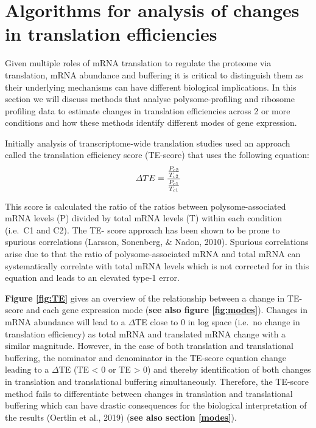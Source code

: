 \documentclass[
  12pt,
  openany]{book}
\begin{document}
\section{Algorithms for analysis of changes in translation efficiencies}\label{algorithm}

Given multiple roles of mRNA translation to regulate the proteome via translation, mRNA abundance and buffering it is critical to distinguish them as their underlying mechanisms can have different biological implications. In this section we will discuss methods that analyse polysome-profiling and ribosome profiling data to estimate changes in translation efficiencies across 2 or more conditions and how these methods identify different modes of gene expression.

Initially analysis of transcriptome-wide translation studies used an approach called the translation efficiency score (TE-score) that uses the following equation:
\[\varDelta TE = \frac{\frac{P_{c2}}{T_{c2}}} {\frac{P_{c1}}{T_{c1}}}\\\]

This score is calculated the ratio of the ratios between polysome-associated mRNA levels (P) divided by total mRNA levels (T) within each condition (i.e.~C1 and C2). The TE- score approach has been shown to be prone to spurious correlations (Larsson, Sonenberg, \& Nadon, 2010). Spurious correlations arise due to that the ratio of polysome-associated mRNA and total mRNA can systematically correlate with total mRNA levels which is not corrected for in this equation and leads to an elevated type-1 error.

\textbf{Figure \ref{fig:TE}} gives an overview of the relationship between a change in TE-score and each gene expression mode (\textbf{see also figure \ref{fig:modes}}). Changes in mRNA abundance will lead to a \(\varDelta\)TE close to 0 in log space (i.e.~no change in translation efficiency) as total mRNA and translated mRNA change with a similar magnitude. However, in the case of both translation and translational buffering, the nominator and denominator in the TE-score equation change leading to a \(\varDelta\)TE (TE \textless{} 0 or TE \textgreater{} 0) and thereby identification of both changes in translation and translational buffering simultaneously. Therefore, the TE-score method fails to differentiate between changes in translation and translational buffering which can have drastic consequences for the biological interpretation of the results (Oertlin et al., 2019) (\textbf{see also section \ref{modes}}).
\end{document}
